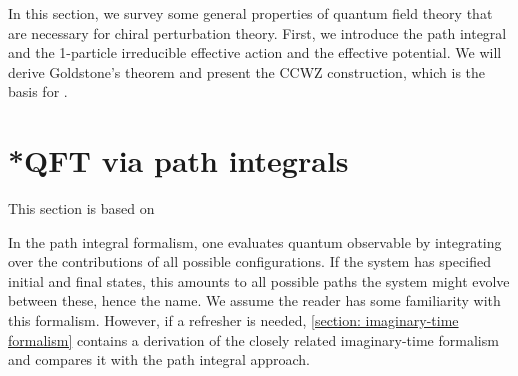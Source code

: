 In this section, we survey some general properties of quantum field theory that are necessary for chiral perturbation theory.
First, we introduce the path integral and the 1-particle irreducible effective action and the effective potential.
We will derive Goldstone's theorem and present the CCWZ construction, which is the basis for \chpt.



\section{*QFT via path integrals}
\label{section: path integral}

This section is based on \autocite{peskinIntroductionQuantumField1995,weinbergQuantumTheoryFields1995,weinbergQuantumTheoryFields1996,schwartzQuantumFieldTheory2013}

In the path integral formalism, one evaluates quantum observable by integrating over the contributions of all possible configurations.
If the system has specified initial and final states, this amounts to all possible paths the system might evolve between these, hence the name.
We assume the reader has some familiarity with this formalism. 
However, if a refresher is needed, \autoref{section: imaginary-time formalism} contains a derivation of the closely related imaginary-time formalism and compares it with the path integral approach.

